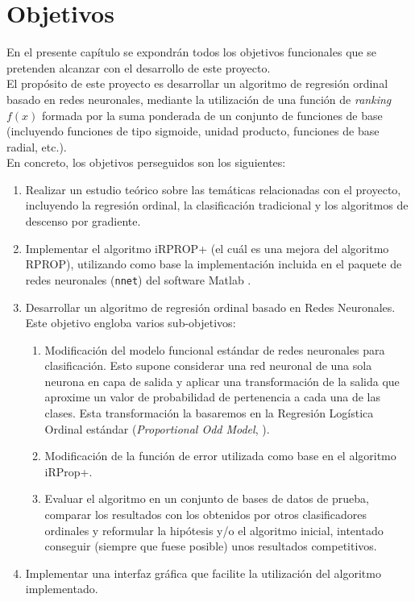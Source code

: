 \chapter{Objetivos}
	
	En el presente capítulo se expondrán todos los objetivos funcionales que se pretenden alcanzar con el desarrollo de este proyecto.\\
	
	El propósito de este proyecto es desarrollar un algoritmo de regresión ordinal basado en redes neuronales, mediante la utilización de una función de \textit{ranking} $f(x)$ formada por la suma ponderada de un conjunto de funciones de base (incluyendo funciones de tipo sigmoide, unidad producto, funciones de base radial, etc.).\\

	En concreto, los objetivos perseguidos son los siguientes:

	\begin{enumerate}
		\item Realizar un estudio teórico sobre las temáticas relacionadas con el proyecto, incluyendo la regresión ordinal, la clasificación tradicional y los algoritmos de descenso por gradiente.
		\item Implementar el algoritmo iRPROP+ (el cuál es una mejora del algoritmo RPROP), utilizando como base la implementación incluida en el paquete de redes neuronales (\verb'nnet') del software Matlab \cite{Matlab}.
		\item Desarrollar un algoritmo de regresión ordinal basado en Redes Neuronales. Este objetivo engloba varios sub-objetivos:
		\begin{enumerate}
	  		\item Modificación del modelo funcional estándar de redes neuronales para clasificación. Esto supone considerar una red neuronal de una sola neurona en capa de salida y aplicar una transformación de la salida que aproxime un valor de probabilidad de pertenencia a cada una de las clases. Esta transformación la basaremos en la Regresión Logística Ordinal estándar (\textit{Proportional Odd Model}, \cite{Mcc80}).
			\item Modificación de la función de error utilizada como base en el algoritmo iRProp+.
			\item Evaluar el algoritmo en un conjunto de bases de datos de prueba, comparar los resultados con los obtenidos por otros clasificadores ordinales y reformular la hipótesis y/o el algoritmo inicial, intentado conseguir (siempre que fuese posible) unos resultados competitivos.
		\end{enumerate}
		\item Implementar una interfaz gráfica que facilite la utilización del algoritmo implementado.
\end{enumerate}
